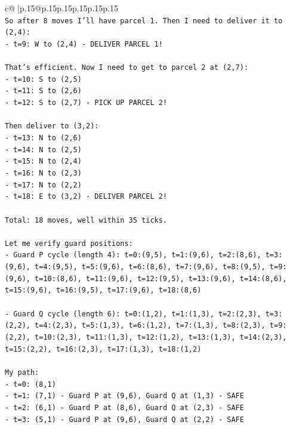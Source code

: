 \documentclass{article}
\begin{document}
{\begin{supertabular}{c@{$\;$}|p{.15\linewidth}@{}p{.15\linewidth}p{.15\linewidth}p{.15\linewidth}p{.15\linewidth}p{.15\linewidth}}
{{{\\ 
\texttt{So after 8 moves I'll have parcel 1. Then I need to deliver it to (2,4):} \\
\texttt{{-} t=9: W to (2,4) {-} DELIVER PARCEL 1!} \\
\\ 
\texttt{That's efficient. Now I need to get to parcel 2 at (2,7):} \\
\texttt{{-} t=10: S to (2,5)} \\
\texttt{{-} t=11: S to (2,6)} \\
\texttt{{-} t=12: S to (2,7) {-} PICK UP PARCEL 2!} \\
\\ 
\texttt{Then deliver to (3,2):} \\
\texttt{{-} t=13: N to (2,6)} \\
\texttt{{-} t=14: N to (2,5)} \\
\texttt{{-} t=15: N to (2,4)} \\
\texttt{{-} t=16: N to (2,3)} \\
\texttt{{-} t=17: N to (2,2)} \\
\texttt{{-} t=18: E to (3,2) {-} DELIVER PARCEL 2!} \\
\\ 
\texttt{Total: 18 moves, well within 35 ticks.} \\
\\ 
\texttt{Let me verify guard positions:} \\
\texttt{{-} Guard P cycle (length 4): t=0:(9,5), t=1:(9,6), t=2:(8,6), t=3:(9,6), t=4:(9,5), t=5:(9,6), t=6:(8,6), t=7:(9,6), t=8:(9,5), t=9:(9,6), t=10:(8,6), t=11:(9,6), t=12:(9,5), t=13:(9,6), t=14:(8,6), t=15:(9,6), t=16:(9,5), t=17:(9,6), t=18:(8,6)} \\
\\ 
\texttt{{-} Guard Q cycle (length 6): t=0:(1,2), t=1:(1,3), t=2:(2,3), t=3:(2,2), t=4:(2,3), t=5:(1,3), t=6:(1,2), t=7:(1,3), t=8:(2,3), t=9:(2,2), t=10:(2,3), t=11:(1,3), t=12:(1,2), t=13:(1,3), t=14:(2,3), t=15:(2,2), t=16:(2,3), t=17:(1,3), t=18:(1,2)} \\
\\ 
\texttt{My path:} \\
\texttt{{-} t=0: (8,1)} \\
\texttt{{-} t=1: (7,1) {-} Guard P at (9,6), Guard Q at (1,3) {-} SAFE} \\
\texttt{{-} t=2: (6,1) {-} Guard P at (8,6), Guard Q at (2,3) {-} SAFE} \\
\texttt{{-} t=3: (5,1) {-} Guard P at (9,6), Guard Q at (2,2) {-} SAFE} \\
}}}
\end{supertabular}}
\end{document}
